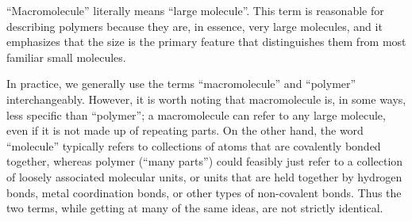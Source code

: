 \begin{activity}
\begin{exercises}
		\begin{solution}
			``Macromolecule'' literally means ``large molecule''.  This term is reasonable for describing polymers because they are, in essence, very large molecules, and it emphasizes that the size is the primary feature that distinguishes them from most familiar small molecules.
			
			In practice, we generally use the terms ``macromolecule'' and ``polymer'' interchangeably.  However, it is worth noting that macromolecule is, in some ways, less specific than ``polymer''; a macromolecule can refer to any large molecule, even if it is not made up of repeating parts.  On the other hand, the word ``molecule'' typically refers to collections of atoms that are covalently bonded together, whereas polymer (``many parts'') could feasibly just refer to a collection of loosely associated molecular units, or units that are held together by hydrogen bonds, metal coordination bonds, or other types of non-covalent bonds.  Thus the two terms, while getting at many of the same ideas, are not strictly identical.
		\end{solution}
	
\end{exercises}



	


	
\end{activity}